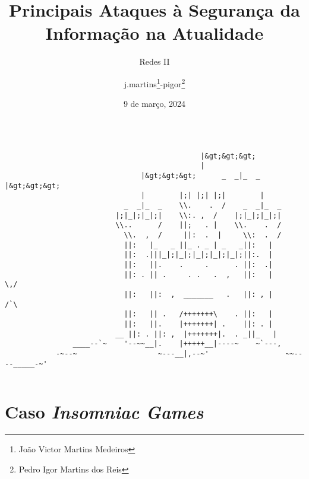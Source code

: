 \documentclass[bookmarks=false,aspectratio=169,9pt]{beamer}
\date{9 de março, 2024}
\title[Seminário - Redes II]{Principais Ataques à Segurança da Informação na Atualidade}
\institute[Pontifícia Universidade Católica de Minas Gerais]{@pucminas}
\author{j.martins\footnote{João Victor Martins Medeiros}-pigor\footnote{Pedro Igor Martins dos Reis}}
\subtitle{Redes II}
\begin{document}
\begin{frame}[fragile]
\begin{columns}
\begin{column}{\textwidth}
\begin{verbatim}
                                              |&gt;&gt;&gt;
                                              |
                                |&gt;&gt;&gt;      _  _|_  _         |&gt;&gt;&gt;
                                |        |;| |;| |;|        |
                            _  _|_  _    \\.    .  /    _  _|_  _
                          |;|_|;|_|;|    \\:. ,  /    |;|_|;|_|;|
                          \\..      /    ||;   . |    \\.    .  /
                            \\.  ,  /     ||:  .  |     \\:  .  /
                            ||:   |_   _ ||_ . _ | _   _||:   |
                            ||:  .|||_|;|_|;|_|;|_|;|_|;||:.  |
                            ||:   ||.    .     .      . ||:  .|
                            ||: . || .     . .   .  ,   ||:   |       \,/
                            ||:   ||:  ,  _______   .   ||: , |            /`\
                            ||:   || .   /+++++++\    . ||:   |
                            ||:   ||.    |+++++++| .    ||: . |
                          __ ||: . ||: ,  |+++++++|.  . _||_   |
                ____--`~    '--~~__|.    |+++++__|----~    ~`---,
            -~--~                   ~---__|,--~'                  ~~----_____-~'
\end{verbatim}
\end{column}
\end{columns}
\end{frame}
\begin{frame}
	\titlepage
\end{frame}
\section{Caso \textit{Insomniac Games}}
\end{document}
